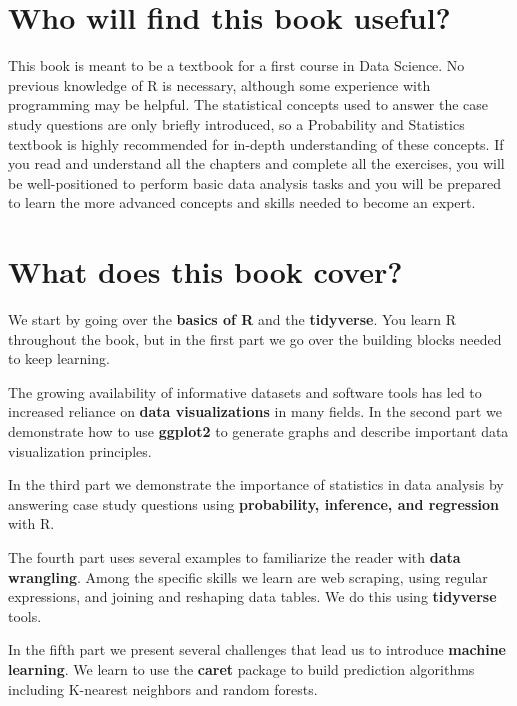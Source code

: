 \documentclass[
]{krantz}
\begin{document}
\hypertarget{who-will-find-this-book-useful}{%
\section*{Who will find this book useful?}\label{who-will-find-this-book-useful}}


This book is meant to be a textbook for a first course in Data Science. No previous knowledge of R is necessary, although some experience with programming may be helpful. The statistical concepts used to answer the case study questions are only briefly introduced, so a Probability and Statistics textbook is highly recommended for in-depth understanding of these concepts. If you read and understand all the chapters and complete all the exercises, you will be well-positioned to perform basic data analysis tasks and you will be prepared to learn the more advanced concepts and skills needed to become an expert.

\hypertarget{what-does-this-book-cover}{%
\section*{What does this book cover?}\label{what-does-this-book-cover}}


We start by going over the \textbf{basics of R} and the \textbf{tidyverse}. You learn R throughout the book, but in the first part we go over the building blocks needed to keep learning.

The growing availability of informative datasets and software tools has led to increased reliance on \textbf{data visualizations} in many fields. In the second part we demonstrate how to use \textbf{ggplot2} to generate graphs and describe important data visualization principles.

In the third part we demonstrate the importance of statistics in data analysis by answering case study questions using \textbf{probability, inference, and regression} with R.

The fourth part uses several examples to familiarize the reader with \textbf{data wrangling}. Among the specific skills we learn are web scraping, using regular expressions, and joining and reshaping data tables. We do this using \textbf{tidyverse} tools.

In the fifth part we present several challenges that lead us to introduce \textbf{machine learning}. We learn to use the \textbf{caret} package to build prediction algorithms including K-nearest neighbors and random forests.
\end{document}
